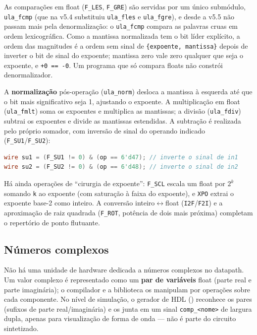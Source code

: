 As comparações em float (\lstinline|F_LES|, \lstinline|F_GRE|) são servidas por um único
submódulo, \lstinline|ula_fcmp| (que na v5.4 substituiu \lstinline|ula_fles| e
\lstinline|ula_fgre|), e desde a v5.5 não passam mais pela denormalização: o
\lstinline|ula_fcmp| compara as palavras cruas em ordem lexicográfica. Como a mantissa normalizada tem o bit líder explícito, a ordem das
magnitudes é a ordem sem sinal de \lstinline|{expoente, mantissa}| depois de inverter o bit
de sinal do expoente; mantissa zero vale zero qualquer que seja o expoente, e
\lstinline|+0 == -0|. Um programa que só compara floats não constrói denormalizador.

A \textbf{normalização} pós-operação (\lstinline|ula_norm|) desloca a mantissa à esquerda até
que o bit mais significativo seja 1, ajustando o expoente. A multiplicação em float
(\lstinline|ula_fmlt|) soma os expoentes e multiplica as mantissas; a divisão
(\lstinline|ula_fdiv|) subtrai os expoentes e divide as mantissas estendidas. A subtração é
realizada pelo próprio somador, com inversão de sinal do operando indicado
(\lstinline|F_SU1|/\lstinline|F_SU2|):

\begin{lstlisting}[language=Verilog]
wire su1 = (F_SU1 != 0) & (op == 6'd47); // inverte o sinal de in1
wire su2 = (F_SU2 != 0) & (op == 6'd48); // inverte o sinal de in2
\end{lstlisting}

Há ainda operações de ``cirurgia de expoente'': \lstinline|F_SCL| escala um float por $2^{k}$
somando \lstinline|k| ao expoente (com saturação à faixa do expoente), e \lstinline|XPO|
extrai o expoente base-2 como inteiro. A conversão inteiro$\leftrightarrow$float
(\lstinline|I2F|/\lstinline|F2I|) e a aproximação de raiz quadrada (\lstinline|F_ROT|, potência
de dois mais próxima) completam o repertório de ponto flutuante.

\subsection{Números complexos}
\label{sec:arq-ula-complex}

Não há uma unidade de hardware dedicada a números complexos no datapath. Um valor complexo é
representado como um \textbf{par de variáveis} float (parte real e parte imaginária); o
compilador e a biblioteca os manipulam por operações sobre cada componente. No nível de
simulação, o gerador de HDL () reconhece os pares (sufixos de parte real/imaginária)
e os junta em um sinal \lstinline|comp_<nome>| de largura dupla, apenas para visualização de
forma de onda --- não é parte do circuito sintetizado.

